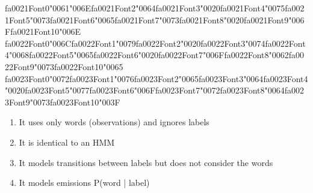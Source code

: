 \documentclass[12pt]{article}
\begin{document}
\begin{enumerate}[label=Q\arabic*.]
{\csname fa0021Font0\endcsname\char"0061}{\char"006E}{\csname fa0021Font2\endcsname\char"0064}{\csname fa0021Font3\endcsname\char"0020}{\csname fa0021Font4\endcsname\char"0075}{\csname fa0021Font5\endcsname\char"0073}{\csname fa0021Font6\endcsname\char"0065}{\csname fa0021Font7\endcsname\char"0073}{\csname fa0021Font8\endcsname\char"0020}{\csname fa0021Font9\endcsname\char"006F}{\csname fa0021Font10\endcsname\char"006E} {\csname fa0022Font0\endcsname\char"006C}{\csname fa0022Font1\endcsname\char"0079}{\csname fa0022Font2\endcsname\char"0020}{\csname fa0022Font3\endcsname\char"0074}{\csname fa0022Font4\endcsname\char"0068}{\csname fa0022Font5\endcsname\char"0065}{\csname fa0022Font6\endcsname\char"0020}{\csname fa0022Font7\endcsname\char"006F}{\csname fa0022Font8\endcsname\char"0062}{\csname fa0022Font9\endcsname\char"0073}{\csname fa0022Font10\endcsname\char"0065} {\csname fa0023Font0\endcsname\char"0072}{\csname fa0023Font1\endcsname\char"0076}{\csname fa0023Font2\endcsname\char"0065}{\csname fa0023Font3\endcsname\char"0064}{\csname fa0023Font4\endcsname\char"0020}{\csname fa0023Font5\endcsname\char"0077}{\csname fa0023Font6\endcsname\char"006F}{\csname fa0023Font7\endcsname\char"0072}{\csname fa0023Font8\endcsname\char"0064}{\csname fa0023Font9\endcsname\char"0073}{\csname fa0023Font10\endcsname\char"003F}
\begin{enumerate}[label=(\Alph*)]
    \item It uses only words (observations) and ignores labels
    \item It is identical to an HMM
    \item It models transitions between labels but does not consider the words
    \item It models emissions P(word | label)
\end{enumerate}

\end{enumerate}
\end{document}
